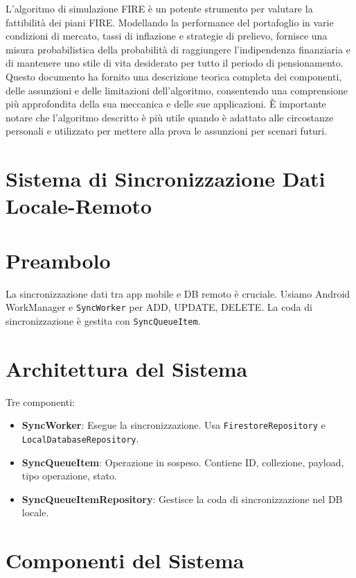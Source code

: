 \documentclass{article}
\begin{document}
L'algoritmo di simulazione FIRE è un potente strumento per valutare la
fattibilità dei piani FIRE. Modellando la performance del portafoglio in varie
condizioni di mercato, tassi di inflazione e strategie di prelievo, fornisce una
misura probabilistica della probabilità di raggiungere l'indipendenza
finanziaria e di mantenere uno stile di vita desiderato per tutto il periodo di
pensionamento.
Questo documento ha fornito una descrizione teorica completa dei
componenti, delle assunzioni e delle limitazioni dell'algoritmo, consentendo una
comprensione più approfondita della sua meccanica e delle sue applicazioni.
È
importante notare che l'algoritmo descritto è più utile quando è adattato alle
circostanze personali e utilizzato per mettere alla prova le assunzioni per
scenari futuri. \section*{Sistema di Sincronizzazione Dati Locale-Remoto}

\section{Preambolo}\label{sec:preambolo3} La sincronizzazione dati tra app
mobile e DB remoto è cruciale.
Usiamo Android WorkManager e \texttt{SyncWorker}
per ADD, UPDATE, DELETE. La coda di sincronizzazione è gestita con
\texttt{SyncQueueItem}.

\section{Architettura del Sistema}\label{sec:architettura-del-sistema} Tre
componenti:
\begin{itemize}
    \item \textbf{SyncWorker}: Esegue la sincronizzazione.
    Usa
    \texttt{FirestoreRepository} e \texttt{LocalDatabaseRepository}.
    \item \textbf{SyncQueueItem}: Operazione in sospeso.
    Contiene ID,
    collezione, payload, tipo operazione, stato.
    \item \textbf{SyncQueueItemRepository}: Gestisce la coda di sincronizzazione
    nel DB locale.
\end{itemize}

\section{Componenti del Sistema}\label{sec:componenti-del-sistema}

\end{document}
